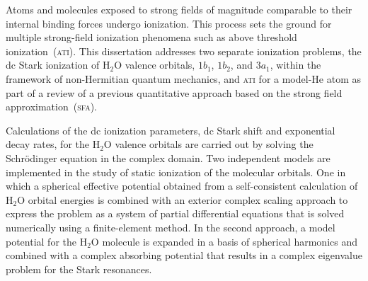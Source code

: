 





Atoms and molecules exposed to strong fields of magnitude comparable
to their internal binding forces undergo ionization. This process sets
the ground for multiple strong-field ionization phenomena such as
above threshold ionization~(\textsc{ati}).
This dissertation addresses two separate ionization problems, the dc
Stark ionization of H$_{2}$O valence orbitals, $1b_{1}$, $1b_{2}$, and
$3a_{1}$, within the framework of non-Hermitian quantum mechanics, and
\textsc{ati} for a model-He atom as part of a review of a previous
quantitative approach based on the strong field
approximation~(\textsc{sfa}).


Calculations of the dc ionization parameters, dc Stark shift and
exponential decay rates, for the H$_{2}$O valence orbitals are carried
out by solving the Schr\"{o}dinger equation in the complex domain. Two
independent models are implemented in the study of static ionization
of the molecular orbitals. One in which a spherical effective
potential obtained from a self-consistent calculation of H$_{2}$O
orbital energies is combined with an exterior complex scaling approach
to express the problem as a system of partial differential equations
that is solved numerically using a finite-element method. In the
second approach, a model potential for the H$_{2}$O molecule is
expanded in a basis of spherical harmonics and combined with a complex
absorbing potential that results in a complex eigenvalue problem for
the Stark resonances.

